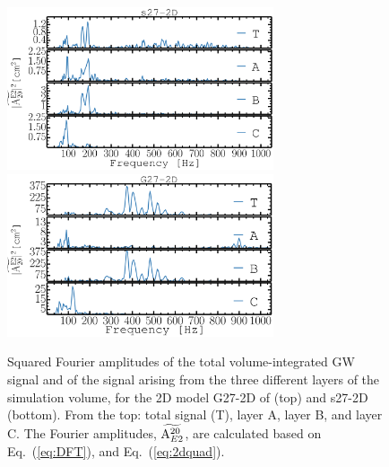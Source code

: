 \begin{figure}
\centering
\includegraphics[width=0.7\textwidth]{./images/paper1/fig9a.pdf} \\
\includegraphics[width=0.7\textwidth]{./images/paper1/fig9b.pdf}
\caption{Squared Fourier amplitudes of the total volume-integrated GW signal
and of the signal arising from the three different layers of the simulation volume,
for the 2D model G27-2D of \citet{mueller_13} (top) and s27-2D (bottom). 
From the top: total signal (T), layer A, layer B, and layer C. 
The Fourier amplitudes, $\widetilde{\mathrm{A}_{\mathrm\mathrm{E2}}^{\mathrm{20}}}$,
are calculated based on Eq.~(\ref{eq:DFT}), and Eq.~(\ref{eq:2dquad}).
\label{fig:2dcut}}
\end{figure}

